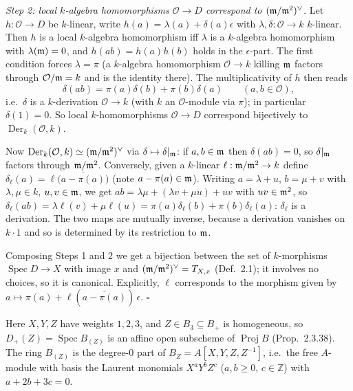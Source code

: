 \documentclass[11pt]{article}
\begin{document}
\emph{Step 2: local $k$-algebra homomorphisms $\mathcal O\to D$ correspond to $(\mathfrak m/\mathfrak m^2)^\vee$.} Let $h:\mathcal O\to D$ be $k$-linear, write $h(a)=\lambda(a)+\delta(a)\epsilon$ with $\lambda,\delta:\mathcal O\to k$ $k$-linear. Then $h$ is a local $k$-algebra homomorphism iff $\lambda$ is a $k$-algebra homomorphism with $\lambda(\mathfrak m)=0$, and $h(ab)=h(a)h(b)$ holds in the $\epsilon$-part. The first condition forces $\lambda=\pi$ (a $k$-algebra homomorphism $\mathcal O\to k$ killing $\mathfrak m$ factors through $\mathcal O/\mathfrak m=k$ and is the identity there). The multiplicativity of $h$ then reads
\[ \delta(ab)=\pi(a)\delta(b)+\pi(b)\delta(a)\qquad(a,b\in\mathcal O), \]
i.e.\ $\delta$ is a $k$-derivation $\mathcal O\to k$ (with $k$ an $\mathcal O$-module via $\pi$); in particular $\delta(1)=0$. So local $k$-homomorphisms $\mathcal O\to D$ correspond bijectively to $\operatorname{Der}_k(\mathcal O,k)$.

Now $\operatorname{Der}_k(\mathcal O,k)\simeq(\mathfrak m/\mathfrak m^2)^\vee$ via $\delta\mapsto\delta|_{\mathfrak m}$: if $a,b\in\mathfrak m$ then $\delta(ab)=0$, so $\delta|_\mathfrak m$ factors through $\mathfrak m/\mathfrak m^2$. Conversely, given a $k$-linear $\ell:\mathfrak m/\mathfrak m^2\to k$ define $\delta_\ell(a)=\ell\bigl(\overline{a-\pi(a)}\bigr)$ (note $a-\pi(a)\in\mathfrak m$). Writing $a=\lambda+u$, $b=\mu+v$ with $\lambda,\mu\in k$, $u,v\in\mathfrak m$, we get $ab=\lambda\mu+(\lambda v+\mu u)+uv$ with $uv\in\mathfrak m^2$, so $\delta_\ell(ab)=\lambda\ell(v)+\mu\ell(u)=\pi(a)\delta_\ell(b)+\pi(b)\delta_\ell(a)$: $\delta_\ell$ is a derivation. The two maps are mutually inverse, because a derivation vanishes on $k\cdot1$ and so is determined by its restriction to $\mathfrak m$.

Composing Steps 1 and 2 we get a bijection between the set of $k$-morphisms $\operatorname{Spec}D\to X$ with image $x$ and $(\mathfrak m/\mathfrak m^2)^\vee=T_{X,x}$ (Def.~2.1); it involves no choices, so it is canonical. Explicitly, $\ell$ corresponds to the morphism given by $a\mapsto\pi(a)+\ell(\overline{a-\pi(a)})\,\epsilon$. \hfill$\square$

\pf
Here $X,Y,Z$ have weights $1,2,3$, and $Z\in B_3\subseteq B_+$ is homogeneous, so $D_+(Z)=\operatorname{Spec}B_{(Z)}$ is an affine open subscheme of $\operatorname{Proj}B$ (Prop.~2.3.38). The ring $B_{(Z)}$ is the degree-$0$ part of $B_Z=A[X,Y,Z,Z^{-1}]$, i.e.\ the free $A$-module with basis the Laurent monomials $X^aY^bZ^c$ ($a,b\ge0$, $c\in\mathbb Z$) with $a+2b+3c=0$.
\end{document}
